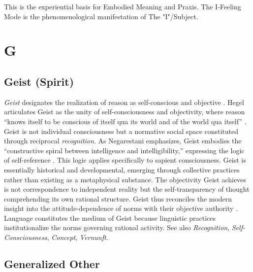\documentclass{book}
\begin{document}
This is the experiential basis for Embodied Meaning and Praxis. The I-Feeling Mode is the phenomenological manifestation of The "I"/Subject.

\parencite{Carspecken1999}

\chapter{G}

\section{Geist (Spirit)}

\textit{Geist} designates the realization of reason as self-conscious and objective \parencite{Hyppolite1974}. Hegel articulates Geist as the unity of self-consciousness and objectivity, where reason ``knows itself to be conscious of itself qua its world and of the world qua itself'' \parencite[325]{Hyppolite1974}. Geist is not individual consciousness but a normative social space constituted through reciprocal \textit{recognition}. As Negarestani emphasizes, Geist embodies the ``constructive spiral between intelligence and intelligibility,'' expressing the logic of self-reference \parencite[25]{Negarestani2018}. This logic applies specifically to sapient consciousness. Geist is essentially historical and developmental, emerging through collective practices rather than existing as a metaphysical substance. The objectivity Geist achieves is not correspondence to independent reality but the self-transparency of thought comprehending its own rational structure. Geist thus reconciles the modern insight into the attitude-dependence of norms with their objective authority \parencite{Brandom:2019aa}. Language constitutes the medium of Geist because linguistic practices institutionalize the norms governing rational activity. See also \textit{Recognition}, \textit{Self-Consciousness}, \textit{Concept}, \textit{Vernunft}.

\section{Generalized Other}
\end{document}
